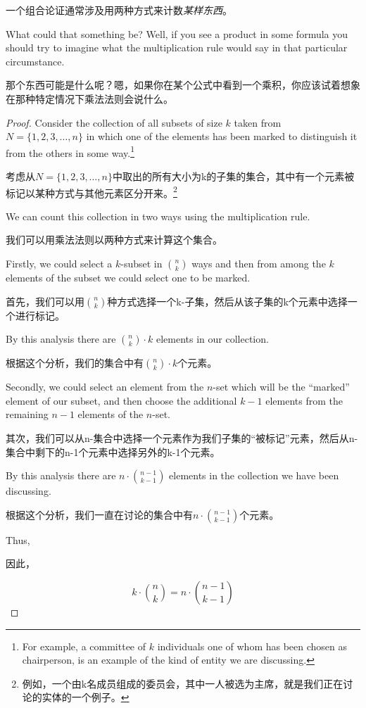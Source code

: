 一个组合论证通常涉及用两种方式来计数\emph{某样东西}。

What could that something be?  Well, if you see a 
product in some formula you should try to imagine what the 
multiplication rule would say in that particular circumstance.

那个东西可能是什么呢？嗯，如果你在某个公式中看到一个乘积，你应该试着想象在那种特定情况下乘法法则会说什么。

\begin{proof} 
Consider the collection of all subsets of size $k$ taken from 
$N = \{1, 2, 3, \ldots, n\}$ in which one of the elements has
been marked to distinguish it from the others in some way.\footnote{
For example, a committee of $k$ individuals one of whom has been %
chosen as chairperson, is an example of the kind of entity we are %
discussing.}

考虑从$N = \{1, 2, 3, \ldots, n\}$中取出的所有大小为k的子集的集合，其中有一个元素被标记以某种方式与其他元素区分开来。\footnote{例如，一个由k名成员组成的委员会，其中一人被选为主席，就是我们正在讨论的实体的一个例子。}

We can count this collection in two ways using the multiplication rule.

我们可以用乘法法则以两种方式来计算这个集合。

Firstly, we could select a $k$-subset in $\binom{n}{k}$ ways and then from
among the $k$ elements of the subset we could select one to be marked.

首先，我们可以用$\binom{n}{k}$种方式选择一个k-子集，然后从该子集的k个元素中选择一个进行标记。

By this analysis there are $\binom{n}{k} \cdot k$ elements in our
collection.

根据这个分析，我们的集合中有$\binom{n}{k} \cdot k$个元素。

Secondly, we could select an element from the $n$-set which will be 
the ``marked'' element of our subset, and then choose the additional
$k-1$ elements from the remaining $n-1$ elements of the $n$-set.

其次，我们可以从n-集合中选择一个元素作为我们子集的“被标记”元素，然后从n-集合中剩下的n-1个元素中选择另外的k-1个元素。

By this analysis there are $n \cdot \binom{n-1}{k-1}$ elements in
the collection we have been discussing.

根据这个分析，我们一直在讨论的集合中有$n \cdot \binom{n-1}{k-1}$个元素。

Thus,

因此，

\[ k \cdot \binom{n}{k} = n \cdot \binom{n-1}{k-1} \]

\end{proof}

